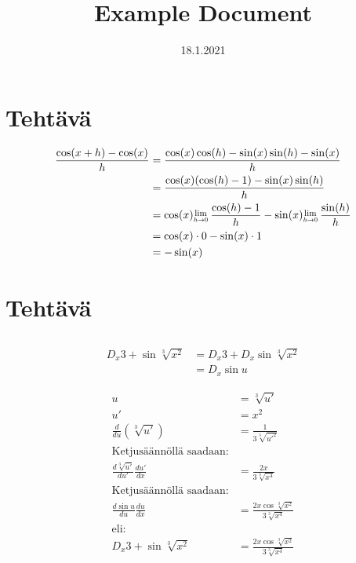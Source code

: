 \documentclass{article}
\title{Example Document}
\date{18.1.2021}
\newcommand{\Lim}[1]{\raisebox{0.5ex}{\scalebox{0.8}{$\displaystyle \lim_{#1}\;$}}}
\begin{document}
\maketitle

\section{Tehtävä}


\begin{align*}
    \frac{\cos(x + h) - \cos(x)}{h} &= \frac{\cos(x)\cos(h) - \sin(x)\sin(h) - \sin(x)}{h}\\
    &= \frac{\cos(x)(\cos(h) - 1) - \sin(x)\sin(h)}{h}\\
    &= \cos(x) \Lim{h \rightarrow 0} \frac{\cos(h) - 1}{h} - \sin(x) \Lim{h \rightarrow 0} \frac{\sin(h)}{h}\\
    &= \cos(x) \cdot 0 - \sin(x) \cdot 1\\
    &= -\sin(x)
\end{align*}

\section{Tehtävä}
\subsection{}

\begin{align*}
    D_x 3 + \sin \sqrt[3]{x^2} &= D_x 3 + D_x \sin \sqrt[3]{x^2}\\
    &= D_x \sin u
\end{align*}

\begin{align*}
    u &= \sqrt[3]{u'}\\
    u' &= x^2\\
    \frac{d}{du}(\sqrt[3]{u'}) &= \frac{1}{3 \sqrt[3]{u'^2}}\\
    \text{Ketjusäännöllä saadaan:}\\
    \frac{d\sqrt[3]{u'}}{du'} \frac{du'}{dx} &= \frac{2x}{3 \sqrt[3]{x^4}}\\
    \text{Ketjusäännöllä saadaan:}\\
    \frac{d \sin u}{du} \frac{du}{dx} &= \frac{2x \cos \sqrt[3]{x^2}}{3 \sqrt[3]{x^4}}\\
    \text{eli:}\\
    D_x 3 + \sin \sqrt[3]{x^2} &= \frac{2x \cos \sqrt[3]{x^2}}{3 \sqrt[3]{x^4}}
\end{align*}
\end{document}
